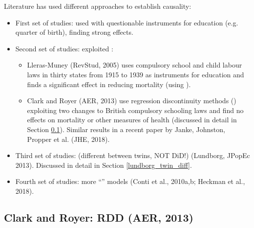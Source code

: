         Literature has used different approaches to establish causality:
        \begin{itemize}
            \item First set of studies: used  with questionable instruments for education (e.g. quarter of birth), finding strong effects.
            \item Second set of studies: exploited :
            \begin{itemize}
                \item Lleras-Muney (RevStud, 2005) uses compulsory school and child labour laws in thirty states from 1915 to 1939 as instruments for education and finds a significant effect in reducing mortality (using ).
                \item Clark and Royer (AER, 2013) use regression discontinuity methods () exploiting two changes to British compulsory schooling laws and find no effects on mortality or other measures of health (discussed in detail in Section \ref{clark_royer_RDD}). Similar results in a recent paper by Janke, Johnston, Propper et al. (JHE, 2018).
            \end{itemize}
            \item Third set of studies:  (different between twins, NOT DiD!) (Lundborg, JPopEc 2013). Discussed in detail in Section \ref{lundborg_twin_diff}.
            \item Fourth set of studies: more “” models (Conti et al., 2010a,b; Heckman et al., 2018).
        \end{itemize}

    \subsection{Clark and Royer: RDD (AER, 2013)}\label{clark_royer_RDD}
    

